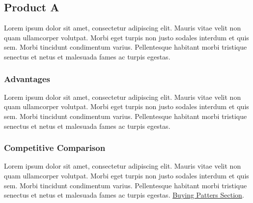 \documentclass[11pt]{article}
\begin{document}
\subsection{Product A}
Lorem ipsum dolor sit amet, consectetur adipiscing elit. Mauris vitae velit 
non quam ullamcorper volutpat. Morbi eget turpis non justo sodales interdum 
et quis sem. Morbi tincidunt condimentum varius. Pellentesque habitant morbi 
tristique senectus et netus et malesuada fames ac turpis egestas.\newline

\subsubsection{Advantages}
Lorem ipsum dolor sit amet, consectetur adipiscing elit. Mauris vitae velit 
non quam ullamcorper volutpat. Morbi eget turpis non justo sodales interdum 
et quis sem. Morbi tincidunt condimentum varius. Pellentesque habitant morbi 
tristique senectus et netus et malesuada fames ac turpis egestas.\newline

\subsubsection{Competitive Comparison}
Lorem ipsum dolor sit amet, consectetur adipiscing elit. Mauris vitae velit 
non quam ullamcorper volutpat. Morbi eget turpis non justo sodales interdum 
et quis sem. Morbi tincidunt condimentum varius. Pellentesque habitant morbi 
tristique senectus et netus et malesuada fames ac turpis egestas.\newline
\hyperlink{competition_and_buying_patterns}{Buying Patters Section}.\newline\newline
\end{document}

